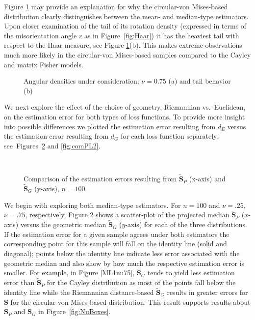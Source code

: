 \noindent Figure \ref{fig:dendetail} may provide an explanation for why the circular-von Mises-based distribution clearly distinguishes between the mean- and median-type estimators.  Upon closer examination of the tail of its rotation density (expressed in terms of the misorientation angle $r$ as in Figure~\ref{fig:Haar}) it has the heaviest tail with respect to the Haar measure, see Figure \ref{fig:dendetail}(b). This makes extreme observations much more likely in the circular-von Mises-based samples compared to the Cayley and matrix Fisher models. \begin{figure}[h!]
\centering
{}
\caption{Angular densities under consideration; $\nu=0.75$ (a) and tail behavior (b) }
\label{fig:dendetail}
\end{figure}

We next explore the effect of the choice of geometry, Riemannian vs.~Euclidean, on the estimation error for both types of loss functions. To provide more insight into possible differences we plotted the estimation error resulting from $d_E$ versus the estimation error resulting from $d_G$ for each loss function separately; see~Figures~\ref{fig:comML1} and \ref{fig:comPL2}.  
\begin{figure}[h]
\centering
{}\\
\caption{Comparison of the estimation errors resulting from $\widetilde{\bm{S}}_P$ (x-axis) and $\widetilde{\bm{S}}_{G}$ (y-axis), $n=100$.}
\label{fig:comML1}
\end{figure}
We begin with exploring both median-type estimators. For $n=100$ and $\nu=.25$,  $\nu=.75$, respectively, Figure \ref{fig:comML1} shows a scatter-plot of the projected median $\widetilde{\bm{S}}_{P}$ ($x$-axis) versus  the geometric median $\widetilde{\bm{S}}_{G}$ ($y$-axis) for each of the three distributions.  If the estimation error for a given sample agrees under both estimators the corresponding point for this sample will fall on the identity line (solid and diagonal); points below the identity line indicate less error associated with the geometric median and also show by how much the respective estimation error is smaller. For example, in Figure \ref{ML1nu75},  $\widetilde{\bm{S}}_G$ tends to yield less estimation error than $\widetilde{\bm{S}}_{P}$  for the Cayley distribution as most of the points fall below the identity line while the Riemannian distance-based $\widetilde{\bm S}_G$ results in greater errors for ${\bm S}$ for the circular-von Mises-based distribution.  This result supports results about $\widetilde{\bm{S}}_{P}$ and $\widetilde{\bm{S}}_{G}$ in Figure~\ref{fig:NuBoxes}.

